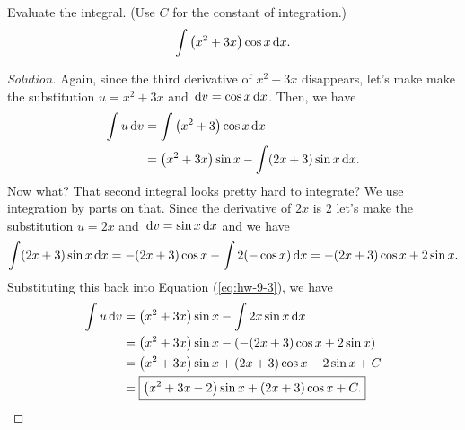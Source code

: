 \begin{problem}[WebAssign HW 9, 3]
Evaluate the integral. (Use $C$ for the constant of integration.)
\[
\int \left( x^2+3x \right)\cos x\,\mathrm{d} x.
\]
\end{problem}
\begin{proof}[Solution]
Again, since the third derivative of $x^2+3x$ disappears, let's make make
the substitution $u=x^2+3x$ and $\,\mathrm{d} v=\cos x\,\mathrm{d} x$. Then, we have
\begin{align}
\label{eq:hw-9-3}
\int u\,\mathrm{d} v
&=\int \left(x^2+3\right)\cos x\,\mathrm{d} x\nonumber\\
&=\left(x^2+3x\right)\sin x-\int (2x+3)\sin x\,\mathrm{d} x.
\end{align}
Now what? That second integral looks pretty hard to integrate? We use
integration by parts on that. Since the derivative of $2x$ is $2$ let's
make the substitution $u=2x$ and $\,\mathrm{d} v=\sin x\,\mathrm{d} x$ and we have
\[
\int (2x+3)\sin x\,\mathrm{d} x=
-(2x+3)\cos x-\int 2(-\cos x)\,\mathrm{d} x
=-(2x+3)\cos x+2\sin x.
\]
Substituting this back into Equation (\ref{eq:hw-9-3}), we have
\begin{align*}
\int u\,\mathrm{d} v
&=\left(x^2+3x\right)\sin x-\int 2x\sin x\,\mathrm{d} x\\
&=\left(x^2+3x\right)\sin x-\left(-(2x+3)\cos x+2\sin x\right)\\
&=\left(x^2+3x\right)\sin x+(2x+3)\cos x-2\sin x+C\\
&=\boxed{\left(x^2+3x-2\right)\sin x+(2x+3)\cos x+C.}
\end{align*}
\end{proof}

